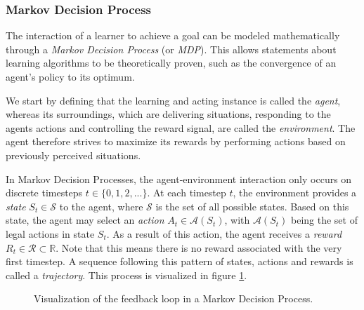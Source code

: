 \subsubsection{Markov Decision Process}
The interaction of a learner to achieve a goal can be modeled mathematically through a \textit{Markov Decision Process} (or \textit{MDP}). This allows statements about learning algorithms to be theoretically proven, such as the convergence of an agent's policy to its optimum. \cite{bible}

We start by defining that the learning and acting instance is called the \textit{agent}, whereas its surroundings, which are delivering situations, responding to the agents actions and controlling the reward signal, are called the \textit{environment}. The agent therefore strives to maximize its rewards by performing actions based on previously perceived situations. \cite{bible}

In Markov Decision Processes, the agent-environment interaction only occurs on discrete timesteps $t \in \{0, 1, 2, ...\}$. At each timestep $t$, the environment provides a \textit{state} $S_t \in \mathscr{S}$ to the agent, where $\mathscr{S}$ is the set of all possible states. Based on this state, the agent may select an \textit{action} $A_t \in \mathscr{A}(S_t)$, with $\mathscr{A}(S_t)$ being the set of legal actions in state $S_t$. As a result of this action, the agent receives a \textit{reward} $R_t \in \mathscr{R} \subset \mathbb{R}$. Note that this means there is no reward associated with the very first timestep. A sequence following this pattern of states, actions and rewards is called a \textit{trajectory}. This process is visualized in figure \ref{fig:mdp_visualization}. \cite{bible}

\begin{figure}[h]
    \centering
    \caption{Visualization of the feedback loop in a Markov Decision Process.}
    \label{fig:mdp_visualization}
\end{figure}

